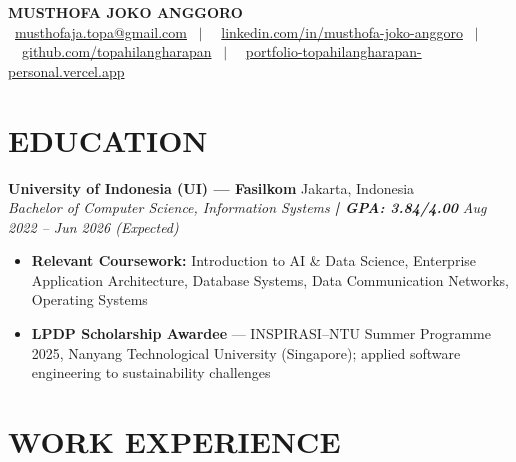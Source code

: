 \documentclass[10pt,a4paper]{article}
\newcommand{\contactline}[1]{\small #1}
\newcommand{\experienceheader}[4]{
    \textbf{#1} \hfill #2 \\
    \textit{#3} \hfill \textit{#4}
}
\begin{document}
\begin{center}
    {\LARGE \textbf{MUSTHOFA JOKO ANGGORO}} \\[2pt]
    \contactline{
        \faEnvelope\ \href{mailto:musthofaja.topa@gmail.com}{musthofaja.topa@gmail.com} \ $|$ \ 
        \faLinkedin\ \href{https://www.linkedin.com/in/musthofa-joko-anggoro/}{linkedin.com/in/musthofa-joko-anggoro} \ $|$ \
        \faGithub\ \href{https://github.com/topahilangharapan}{github.com/topahilangharapan} \ $|$ \
        \faGlobe\ \href{https://portfolio-topahilangharapan-personal.vercel.app/}{portfolio-topahilangharapan-personal.vercel.app}
    }
\end{center}

\vspace{-8pt}

\section*{EDUCATION}

\experienceheader{University of Indonesia (UI) --- Fasilkom}{Jakarta, Indonesia}{Bachelor of Computer Science, Information Systems \textbf{| GPA: 3.84/4.00}}{Aug 2022 -- Jun 2026 (Expected)}
\begin{itemize}[leftmargin=*, itemsep=0.5pt, topsep=1pt]
    \item \textbf{Relevant Coursework:} Introduction to AI \& Data Science, Enterprise Application Architecture, Database Systems, Data Communication Networks, Operating Systems
    \item \textbf{LPDP Scholarship Awardee} --- INSPIRASI--NTU Summer Programme 2025, Nanyang Technological University (Singapore); applied software engineering to sustainability challenges
\end{itemize}

\vspace{-5pt}

\section*{WORK EXPERIENCE}
\end{document}

